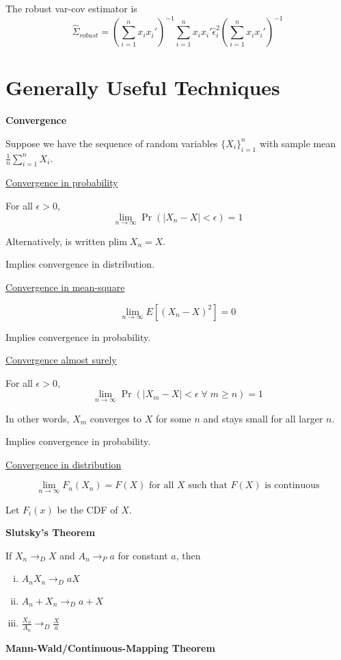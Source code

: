 \documentclass[16pt]{article}
\newcommand{\plim}{\text{plim}\; }
\begin{document}
The robust var-cov estimator is $$\hat{\Sigma}_{robust} = (\sum_{i=1}^n x_i x_i')^{-1} \sum_{i=1}^n x_i x_i' \hat{\epsilon}_i^2(\sum_{i=1}^n x_i x_i')^{-1}$$

\section*{Generally Useful Techniques}

\textbf{Convergence}

Suppose we have the sequence of random variables $\{ X_i \}_{i=1}^n$ with sample mean $\frac{1}{n} \sum_{i=1}^n X_i$.

\underline{Convergence in probability}

For all $\epsilon > 0$, $$\lim_{n \to \infty} \Pr(\mid X_n - X \mid < \epsilon) = 1$$

Alternatively, is written $\plim X_n = X$.

Implies convergence in distribution.

\underline{Convergence in mean-square}

$$\lim_{n \to \infty} E[(X_n - X)^2] = 0$$

Implies convergence in probability.

\underline{Convergence almost surely}

For all $\epsilon > 0$, $$\lim_{n\to\infty} \Pr(\mid X_m - X\mid < \epsilon\;\forall\; m \geq n) = 1$$

In other words, $X_m$ converges to $X$ for some $n$ and stays small for all larger $n$.

Implies convergence in probability.

\underline{Convergence in distribution}

$$\lim_{n\to\infty} F_n(X_n) = F(X) \text{ for all $X$ such that $F(X)$ is continuous}$$ 

Let $F_i(x)$ be the CDF of $X$.

\textbf{Slutsky's Theorem}

If $X_n \to_D X$ and $A_n \to_P a$ for constant $a$, then

\begin{enumerate}[(i)]
  \item $A_n X_n \to_D aX$
  \item $A_n + X_n \to_D a + X$
  \item $\frac{X_n}{A_n} \to_D \frac{X}{a}$
\end{enumerate}

\textbf{Mann-Wald/Continuous-Mapping Theorem}
\end{document}

